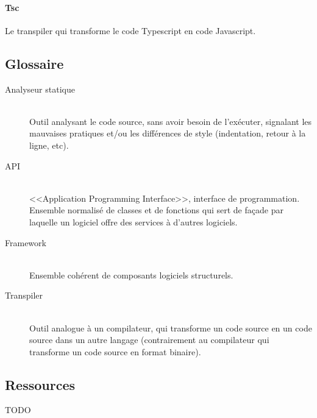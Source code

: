 \documentclass[a4paper,french,12pt]{article}
\begin{document}
		\paragraph{Tsc}
		Le transpiler qui transforme le code Typescript en code Javascript.

	\subsection{Glossaire}
		\begin{description}
		
		\item [Analyseur statique]~\\
			Outil analysant le code source, sans avoir besoin de l'exécuter, signalant les mauvaises pratiques et/ou les différences de style (indentation, retour à la ligne, etc).

		\item [API]~\\
		    <<Application Programming Interface>>, interface de programmation. Ensemble normalisé de classes et de
		    fonctions qui sert de façade par laquelle un logiciel offre des services à d'autres logiciels.

		\item [Framework]~\\
		    Ensemble cohérent de composants logiciels structurels.
		    
		\item [Transpiler]~\\
			Outil analogue à un compilateur, qui transforme un code source en un code source dans un autre langage (contrairement au compilateur qui transforme un code source en format binaire).
		

		\end{description}

	\subsection{Ressources}
	  \begin{description}
	 		  	\item TODO
	  \end{description}
\end{document}
